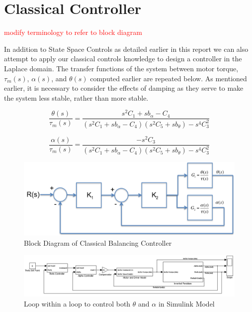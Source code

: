 \documentclass{article}
\newcommand{\xxx}[1]{\textcolor{red}{#1}}
\theoremstyle{plain}
\theoremstyle{definition}
\theoremstyle{remark}
\begin{document}
\clearpage
\section{Classical Controller}

\xxx{modify terminology to refer to block diagram}

In addition to State Space Controls as detailed earlier in this report we can also attempt to apply our classical controls knowledge to design a controller in the Laplace domain.  The transfer functions of the system between motor torque, $\tau_m(s)$, $\alpha(s)$, and $\theta(s)$ computed earlier are repeated below.  As mentioned earlier, it is necessary to consider the effects of damping as they serve to make the system less stable, rather than more stable.  

\begin{equation}
 \frac{\theta(s)}{\tau_{m}(s)} = \frac{s^2 C_1 + s b_{\alpha} - C_4}{\left(s^2C_1 + s b_{\alpha} - C_4 \right) \left(s^2 C_5  + s b_{\theta} \right) - s^4 C_3^2}
\label{thetaTF1}
\end{equation}

\begin{equation}
\frac{\alpha(s)}{\tau_{m}(s)} = \frac{-s^2 C_3}{\left(s^2C_1 + s b_{\alpha} - C_4 \right) \left(s^2 C_5  + s b_{\theta} \right) - s^4 C_3^2}
\label{alphaTF2}
\end{equation}

\begin{figure}
\begin{center}
\includegraphics[width = 15cm]{classicalBlockDesign.png}
\end{center}
\caption{Block Diagram of Classical Balancing Controller}
\label{classicalControllerBlock}
\end{figure}

\begin{figure}
\begin{center}
\includegraphics[width = 17cm]{ClassicalControllerBlock.png}
\end{center}
\caption{Loop within a loop to control both $\theta$ and $\alpha$ in Simulink Model}
\label{classicalSimulink}
\end{figure}
\end{document}
